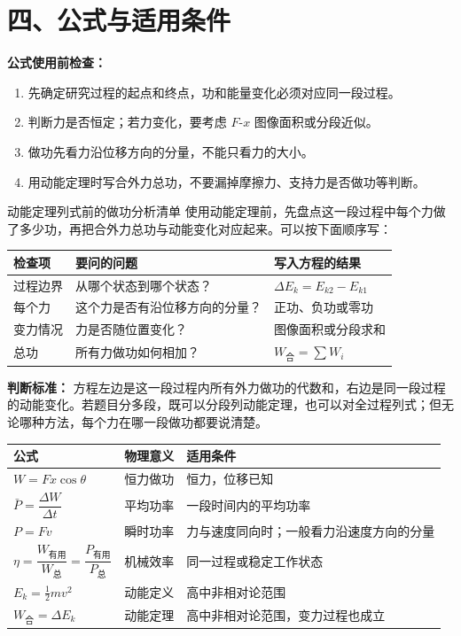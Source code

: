 \section*{四、公式与适用条件}

\textbf{公式使用前检查：}
\begin{enumerate}
  \item 先确定研究过程的起点和终点，功和能量变化必须对应同一段过程。
  \item 判断力是否恒定；若力变化，要考虑 $F$-$x$ 图像面积或分段近似。
  \item 做功先看力沿位移方向的分量，不能只看力的大小。
  \item 用动能定理时写合外力总功，不要漏掉摩擦力、支持力是否做功等判断。
\end{enumerate}

\begin{learningbox}{动能定理列式前的做功分析清单}
使用动能定理前，先盘点这一段过程中每个力做了多少功，再把合外力总功与动能变化对应起来。可以按下面顺序写：

\begin{center}
\begin{tabular}{p{}p{}p{}}
\toprule
检查项 & 要问的问题 & 写入方程的结果 \\
\midrule
过程边界 & 从哪个状态到哪个状态？ & $\Delta E_k=E_{k2}-E_{k1}$ \\
每个力 & 这个力是否有沿位移方向的分量？ & 正功、负功或零功 \\
变力情况 & 力是否随位置变化？ & 图像面积或分段求和 \\
总功 & 所有力做功如何相加？ & $W_{\text{合}}=\sum W_i$ \\
\bottomrule
\end{tabular}
\end{center}

\textbf{判断标准：} 方程左边是这一段过程内所有外力做功的代数和，右边是同一段过程的动能变化。若题目分多段，既可以分段列动能定理，也可以对全过程列式；但无论哪种方法，每个力在哪一段做功都要说清楚。
\end{learningbox}

\begin{center}
\begin{tabular}{lll}
\toprule
公式 & 物理意义 & 适用条件 \\
\midrule
$W = Fx\cos\theta$ & 恒力做功 & 恒力，位移已知 \\
$\bar P = \dfrac{\Delta W}{\Delta t}$ & 平均功率 & 一段时间内的平均功率 \\
$P = Fv$ & 瞬时功率 & 力与速度同向时；一般看力沿速度方向的分量 \\
$\eta=\dfrac{W_{\text{有用}}}{W_{\text{总}}}
=\dfrac{P_{\text{有用}}}{P_{\text{总}}}$ & 机械效率 & 同一过程或稳定工作状态 \\
$E_k = \frac12 mv^2$ & 动能定义 & 高中非相对论范围 \\
$W_{\text{合}} = \Delta E_k$ & 动能定理 & 高中非相对论范围，变力过程也成立 \\
\bottomrule
\end{tabular}
\end{center}

